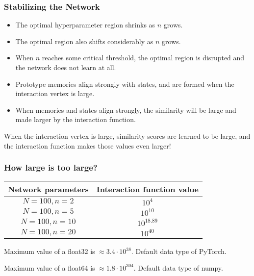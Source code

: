 \begin{frame}
    \frametitle{Stabilizing the Network}
    
    \begin{itemize}
        \item The optimal hyperparameter region shrinks as \(n\) grows.
        \item The optimal region also shifts considerably as \(n\) grows.
        \item When \(n\) reaches some critical threshold, the optimal region is disrupted and the network does not learn at all.
        \pause
        \item Prototype memories align strongly with states, and are formed when the interaction vertex is large.
        \pause
        \item When memories and states align strongly, the similarity will be large and made larger by the interaction function.
    \end{itemize}
    
    \pause
    \begin{block}{}
        When the interaction vertex is large, similarity scores are learned to be large, and the interaction function makes those values even larger!
    \end{block}
    
\end{frame}

\begin{frame}
    \frametitle{How large is too large?}

    \begin{center}
        \begin{tabular}{| c | c |}
            \hline
            Network parameters & Interaction function value \\
            \hline
            \hline
            \(N=100, n=2\) & \(10^{4}\) \\
            \hline
            \(N=100, n=5\) & \(10^{10}\) \\
            \hline
            \(N=100, n=10\) & \(10^{18.89}\) \\
            \hline
            \(N=100, n=20\) & \(10^{40}\) \\
            \hline
        \end{tabular}
    \end{center}

    \pause
    Maximum value of a float32 is \(\approx 3.4 \cdot 10^{38}\). Default data type of PyTorch.

    \pause
    Maximum value of a float64 is \(\approx 1.8 \cdot 10^{304}\). Default data type of numpy.
\end{frame}
    

